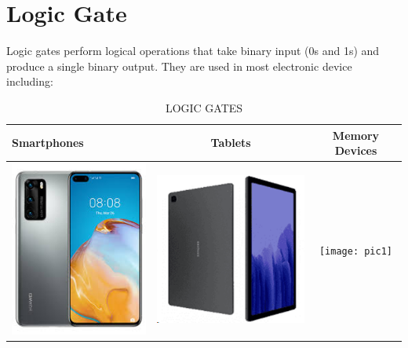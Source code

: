 \documentclass{article}
\begin{document}
	\section{Logic Gate}
	Logic gates perform logical operations that take binary input (0s and 1s) and produce  a single binary output. They are used in most electronic device including:
	\begin{table}[h!]
		\begin{center}
			\caption{LOGIC GATES}
			\label{tab:table1}
			\begin{tabular}{|l|c|c|}
				\hline
				Smartphones
				&
				Tablets
				&
				Memory Devices
				\\
				\hline
				\includegraphics[width=0.2\linewidth]{smartphone1}
				&
				\includegraphics[width=0.25\linewidth]{Tablet}
				&
				\texttt{[image: pic1]}
				\\
				\hline
			\end{tabular}
			
			
		\end{center}
	\end{table}
	
\end{document}
